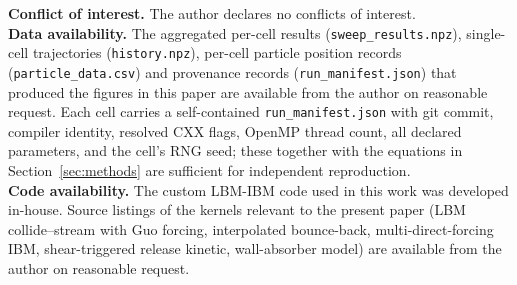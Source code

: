 \documentclass[11pt,a4paper]{article}
\begin{document}
\textbf{Conflict of interest.} The author declares no conflicts
of interest.\\
\textbf{Data availability.} The aggregated per-cell results
(\verb|sweep_results.npz|), single-cell trajectories
(\verb|history.npz|), per-cell particle position records
(\verb|particle_data.csv|) and provenance records
(\verb|run_manifest.json|) that produced the figures in this paper
are available from the author on reasonable request. Each cell
carries a self-contained \verb|run_manifest.json| with git
commit, compiler identity, resolved CXX flags, OpenMP thread
count, all declared parameters, and the cell's RNG seed; these
together with the equations in Section~\ref{sec:methods} are
sufficient for independent reproduction.\\
\textbf{Code availability.} The custom LBM-IBM code used in this
work was developed in-house. Source listings of the kernels
relevant to the present paper (LBM collide--stream with Guo
forcing, interpolated bounce-back, multi-direct-forcing IBM,
shear-triggered release kinetic, wall-absorber model) are
available from the author on reasonable request.


\end{document}
